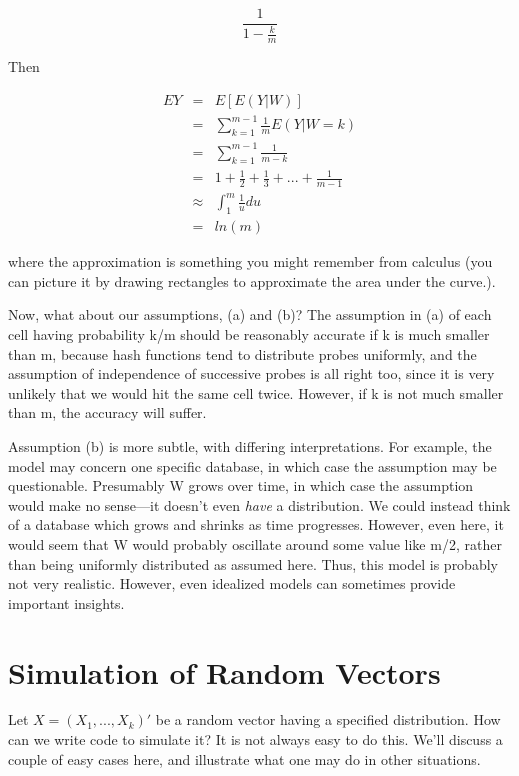 \begin{equation} 
\frac{1}{1-\frac{k}{m}}
\end{equation}

Then 

\begin{eqnarray}
EY & = & E[E(Y|W)]\\
 & = & \sum ^{m-1}_{k=1}\frac{1}{m}E(Y|W=k)\\
 & = & \sum ^{m-1}_{k=1}\frac{1}{m-k}\\
 & = & 1+\frac{1}{2}+\frac{1}{3}+...+\frac{1}{m-1}\\
 & \approx  & \int_1^m \frac{1}{u} du \\
 & = & ln(m)
\end{eqnarray}

where the approximation is something you might remember from calculus
(you can picture it by drawing rectangles to approximate the area under
the curve.).

Now, what about our assumptions, (a) and (b)?  The assumption in (a) of
each cell having probability k/m should be reasonably accurate if k is
much smaller than m, because hash functions tend to distribute probes
uniformly, and the assumption of independence of successive probes is
all right too, since it is very unlikely that we would hit the same cell
twice.  However, if k is not much smaller than m, the accuracy will
suffer.

Assumption (b) is more subtle, with differing interpretations.  For
example, the model may concern one specific database, in which case the
assumption may be questionable.  Presumably W grows over time, in which
case the assumption would make no sense---it doesn't even {\it have} a
distribution.  We could instead think of a database which grows and
shrinks as time progresses.  However, even here, it would seem that W
would probably oscillate around some value like m/2, rather than being
uniformly distributed as assumed here.  Thus, this model is probably not
very realistic.  However, even idealized models can sometimes provide
important insights.

\section{Simulation of Random Vectors}

Let $X = (X_1,...,X_k)'$ be a random vector having a specified
distribution.  How can we write code to simulate it?  It is not always
easy to do this.  We'll discuss a couple of easy cases here, and
illustrate what one may do in other situations.

